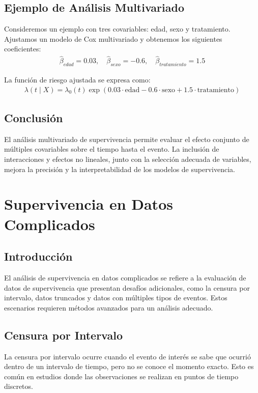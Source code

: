 \documentclass[a4paper]{report} %
\begin{document}
\section{Ejemplo de An\'alisis Multivariado}
Consideremos un ejemplo con tres covariables: edad, sexo y tratamiento. Ajustamos un modelo de Cox multivariado y obtenemos los siguientes coeficientes:
\begin{eqnarray*}
\hat{\beta}_{edad} = 0.03, \quad \hat{\beta}_{sexo} = -0.6, \quad \hat{\beta}_{tratamiento} = 1.5
\end{eqnarray*}

La funci\'on de riesgo ajustada se expresa como:
\begin{eqnarray*}
\lambda(t \mid X) = \lambda_0(t) \exp(0.03 \cdot \text{edad} - 0.6 \cdot \text{sexo} + 1.5 \cdot \text{tratamiento})
\end{eqnarray*}

\section{Conclusi\'on}
El an\'alisis multivariado de supervivencia permite evaluar el efecto conjunto de m\'ultiples covariables sobre el tiempo hasta el evento. La inclusi\'on de interacciones y efectos no lineales, junto con la selecci\'on adecuada de variables, mejora la precisi\'on y la interpretabilidad de los modelos de supervivencia.



\chapter{Supervivencia en Datos Complicados}

\section{Introducci\'on}
El análisis de supervivencia en datos complicados se refiere a la evaluaci\'on de datos de supervivencia que presentan desaf\'ios adicionales, como la censura por intervalo, datos truncados y datos con m\'ultiples tipos de eventos. Estos escenarios requieren m\'etodos avanzados para un análisis adecuado.

\section{Censura por Intervalo}
La censura por intervalo ocurre cuando el evento de inter\'es se sabe que ocurri\'o dentro de un intervalo de tiempo, pero no se conoce el momento exacto. Esto es com\'un en estudios donde las observaciones se realizan en puntos de tiempo discretos.
\end{document}
